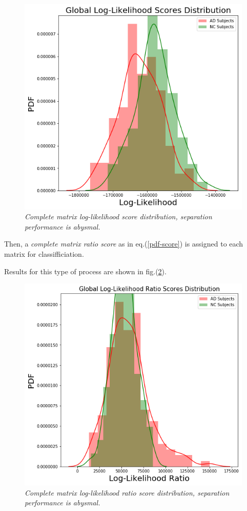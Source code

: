 \documentclass[12pt,openright,twoside,a4paper]{book}
\begin{document}
\begin{figure}[!h]
\centering
\includegraphics[scale=0.5]{ADNI-global}
\caption{\textit{Complete matrix log-likelihood score distribution, separation performance is abysmal.}}
\label{ADNI-global}
\end{figure}

Then, a \textit{complete matrix ratio score} as in eq.(\ref{pdf-score}) is assigned to each matrix for classifficiation. 

Results for this type of process are shown in fig.(\ref{ADNI-Rglobal}).

\begin{figure}[!h]
\centering
\includegraphics[scale=0.5]{ADNI-Rglobal}
\caption{\textit{Complete matrix log-likelihood ratio score distribution, separation performance is abysmal.}}
\label{ADNI-Rglobal}
\end{figure}
\end{document}
